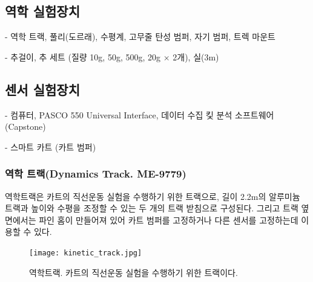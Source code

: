 \documentclass[12pt,a4paper]{article}
\begin{document}
\subsection{역학 실험장치}
- 역학 트랙, 풀리(도르래), 수평계, 고무줄 탄성 범퍼, 자기 범퍼, 트렉 마운트

- 추걸이, 추 세트 (질량 10g, 50g, 500g, 20g $\times$ 2개), 실(3m)
\subsection{센서 실험장치}
- 컴퓨터, PASCO 550 Universal Interface, 데이터 수집 킻 분석 소프트웨어(Capstone)

- 스마트 카트 (카트 범퍼)

\subsubsection{역학 트랙(Dynamics Track. ME-9779)}
역학트랙은 카트의 직선운동 실험을 수행하기 위한 트랙으로, 길이 2.2m의 알루미늄 트랙과
높이와 수평을 조정할 수 있는 두 개의 트랙 받침으로 구성된다. 그리고 트랙 옆면에서는
파인 홈이 만들어져 있어 카트 범퍼를 고정하거나 다른 센서를 고정하는데 이용할 수 있다.
\begin{figure}
    \centering
    \texttt{[image: kinetic\_track.jpg]}
    \caption{\label{fig2} 역학트랙. 카트의 직선운동 실험을 수행하기 위한 트랙이다.}
\end{figure}
\end{document}
